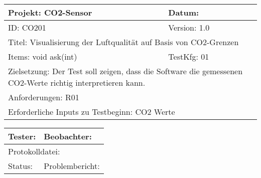 \label{Testing}

\begin{table}[!hbt]
	
	\centering
	
	\begin{tabular}{|p{5cm}|p{5cm}|}
		
		\hline
		Projekt: CO2-Sensor & Datum: \\
		\hline
		ID: CO201 & Version: 1.0 \\
		\hline
		\multicolumn{2}{|l|}{Titel: Visualisierung der Luftqualität auf Basis von CO2-Grenzen} \\
		\hline
		Items: void ask(int) & TestKfg: 01 \\
		\hline
		\multicolumn{2}{|p{\textwidth-2\tabcolsep}|}{Zielsetzung: Der Test soll zeigen, dass die Software die gemessenen CO2-Werte richtig interpretieren kann.} \\
		\hline
		\multicolumn{2}{|l|}{Anforderungen: R01} \\
		\hline
		\multicolumn{2}{|l|}{Erforderliche Inputs zu Testbeginn: CO2 Werte} \\
		\hline
			
	\end{tabular}

\label{tab:Test_1}

\end{table}

\begin{table}[!hbt]
	
	\centering
	
	\begin{tabular}{|p{5cm}|p{5cm}|}
	
		\hline
		Tester: & Beobachter: \\
		\hline
		\multicolumn{2}{|l|}{Protokolldatei:} \\
		\hline
		Status: & Problembericht: \\
		\hline
	
	\end{tabular}

	\label{tab:Tester1}

\end{table}


